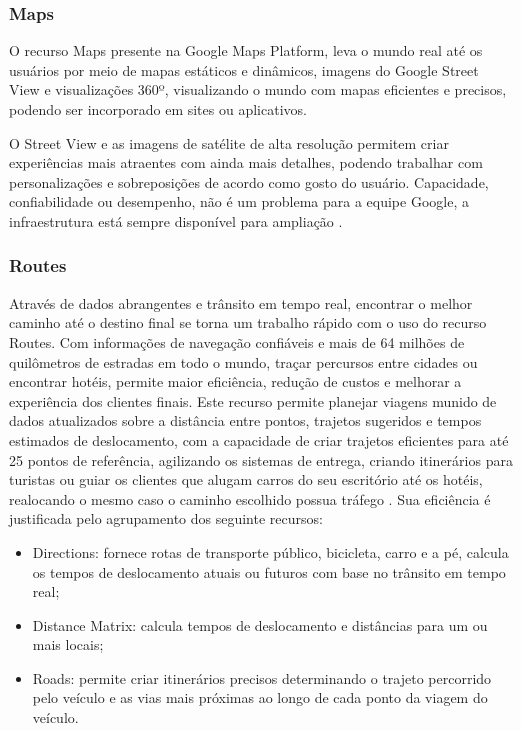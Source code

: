 \subsubsection{Maps}
O recurso Maps presente na Google Maps Platform, leva o mundo real até os usuários por meio de mapas estáticos e dinâmicos, imagens do Google Street View e visualizações 360º, visualizando o mundo com mapas eficientes e precisos, podendo ser incorporado em sites ou aplicativos. 

O Street View e as imagens de satélite de alta resolução permitem criar experiências mais atraentes com ainda mais detalhes, podendo trabalhar com personalizações e sobreposições de acordo como gosto do usuário. Capacidade, confiabilidade ou desempenho, não é um problema para a equipe Google, a infraestrutura está sempre disponível para ampliação \cite{google:2019}. 

\subsubsection{Routes}
Através de dados abrangentes e trânsito em tempo real, encontrar o melhor caminho até o destino final se torna um trabalho rápido com o uso do recurso Routes. Com informações de navegação confiáveis e mais de 64 milhões de quilômetros de estradas em todo o mundo, traçar percursos entre cidades ou encontrar hotéis, permite maior eficiência, redução de custos e melhorar a experiência dos clientes finais. Este recurso permite planejar viagens munido de dados atualizados sobre a distância entre pontos, trajetos sugeridos e tempos estimados de deslocamento, com a capacidade de criar trajetos eficientes para até 25 pontos de referência, agilizando os sistemas de entrega, criando itinerários para turistas ou guiar os clientes que alugam carros do seu escritório até os hotéis, realocando o mesmo caso o caminho escolhido possua tráfego \cite{google:2019}. Sua eficiência é justificada pelo agrupamento dos seguinte recursos:

\begin{itemize}
    \item Directions: fornece rotas de transporte público, bicicleta, carro e a pé, calcula os tempos de deslocamento atuais ou futuros com base no trânsito em tempo real;
    \item Distance Matrix: calcula tempos de deslocamento e distâncias para um ou mais locais;
    \item Roads: permite criar itinerários precisos determinando o trajeto percorrido pelo veículo e as vias mais próximas ao longo de cada ponto da viagem do veículo.
\end{itemize}

